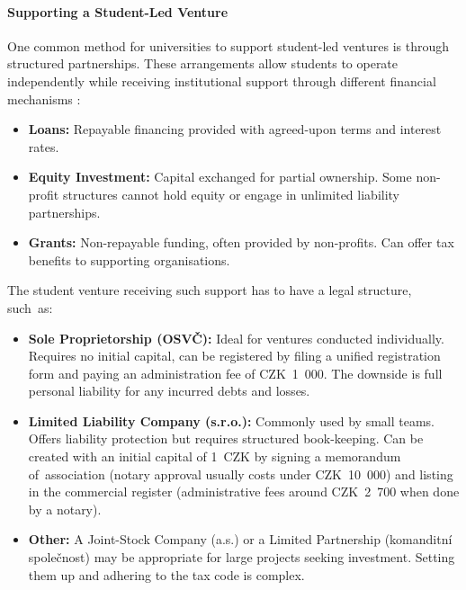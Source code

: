 \paragraph{Supporting a Student-Led Venture}\label{subsec:supporting-student-venture}
One common method for universities to support student-led ventures is through structured partnerships. These arrangements allow students to operate independently while receiving institutional support through different financial mechanisms \cite{fundinvoice-funding}:
\begin{itemize}
    \item \textbf{Loans:} Repayable financing provided with agreed-upon terms and interest rates.
    \item \textbf{Equity Investment:} Capital exchanged for partial ownership. Some non-profit structures cannot hold equity or engage in unlimited liability partnerships.
    \item \textbf{Grants:} Non-repayable funding, often provided by non-profits. Can offer tax benefits to supporting organisations.
\end{itemize}
The student venture receiving such support has to have a legal structure, such~as:
\begin{itemize}
    \item \textbf{Sole Proprietorship (OSVČ):} Ideal for ventures conducted individually. Requires no initial capital, can be registered by filing a unified registration form and paying an administration fee of CZK~1~000. The downside is full personal liability for any incurred debts and losses. \cite{fakturoid-osvc, Zapletalova-osvc, lano-payroll, mpsv-social-sec}
    \item \textbf{Limited Liability Company (s.r.o.):} Commonly used by small teams. Offers liability protection but requires structured book-keeping. Can be created with an initial capital of 1~CZK by signing a memorandum of~association (notary approval usually costs under CZK~10~000) and listing in the commercial register (administrative fees around CZK~2~700 when done by a notary). \cite{vajda-llc, lano-payroll, mpsv-social-sec}
    \item \textbf{Other:} A Joint-Stock Company (a.s.) or a Limited Partnership (komanditní společnost) may be appropriate for large projects seeking investment. Setting them up and adhering to the tax code is complex.\cite{jake-obchodni-spolecnosti}
\end{itemize}

